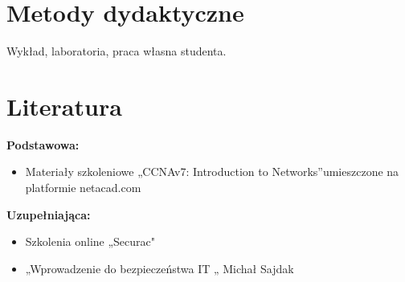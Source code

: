 \documentclass[12pt, a4paper]{article}
\begin{document}
\section{Metody dydaktyczne}

Wykład, laboratoria, praca własna studenta.

\section{Literatura}

\textbf{Podstawowa:}
\begin{itemize}
  \item Materiały szkoleniowe „CCNAv7: Introduction to Networks”umieszczone na platformie netacad.com
\end{itemize}

\textbf{Uzupełniająca:}
\begin{itemize}
  \item Szkolenia  online „Securac"
  \item „Wprowadzenie do bezpieczeństwa IT „ Michał Sajdak
\end{itemize}
\end{document}
